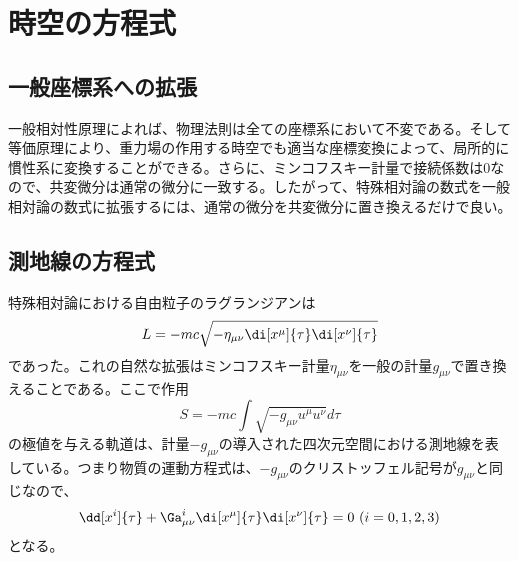 \section{時空の方程式}

\subsection{一般座標系への拡張}
    一般相対性原理によれば、物理法則は全ての座標系において不変である。そして等価原理により、重力場の作用する時空でも適当な座標変換によって、局所的に慣性系に変換することができる。さらに、ミンコフスキー計量で接続係数は0なので、共変微分は通常の微分に一致する。したがって、特殊相対論の数式を一般相対論の数式に拡張するには、通常の微分を共変微分に置き換えるだけで良い。

\subsection{測地線の方程式}
    特殊相対論における自由粒子のラグランジアンは
        \[L = -mc\sqrt{-\eta_{\mu\nu}\di[x^\mu]{\tau}\di[x^\nu]{\tau}}\]
    であった。これの自然な拡張はミンコフスキー計量$\eta_{\mu\nu}$を一般の計量$g_{\mu\nu}$で置き換えることである。ここで作用
        \[S = -mc\int \sqrt{-g_{\mu\nu}u^\mu u^\nu}d\tau\]
    の極値を与える軌道は、計量$-g_{\mu\nu}$の導入された四次元空間における測地線を表している。つまり物質の運動方程式は、$-g_{\mu\nu}$のクリストッフェル記号が$g_{\mu\nu}$と同じなので、
        \[\dd[x^i]{\tau}+\Ga^i_{\mu\nu}\di[x^\mu]{\tau}\di[x^\nu]{\tau} = 0\ (i=0,1,2,3)\]
    となる。

